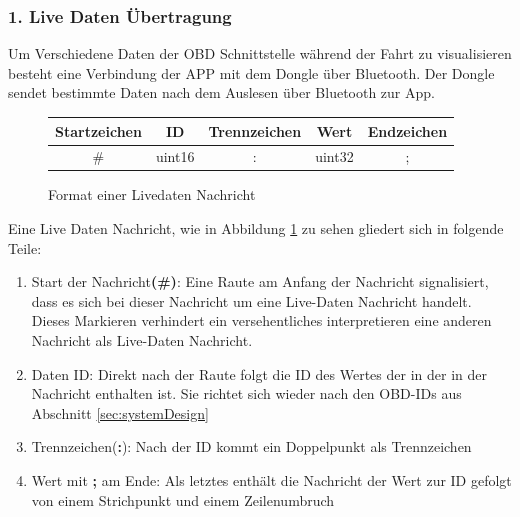 \subsubsection*{1. Live Daten Übertragung}
Um Verschiedene Daten der OBD Schnittstelle während der Fahrt zu visualisieren besteht eine Verbindung der APP mit dem Dongle über Bluetooth. Der Dongle sendet bestimmte Daten nach dem Auslesen über Bluetooth zur App.
\begin{figure}[h]
\begin{center}
  \begin{tabular}{ | c | c | c | c | c |}
    \hline
    Startzeichen & ID & Trennzeichen & Wert & Endzeichen \\ \hline
    \# & uint16 & : & uint32 & ; \\
    \hline
  \end{tabular}
  \caption{Format einer Livedaten Nachricht}
  \label{fig:LiveDataMessage}
\end{center}
\end{figure}
Eine Live Daten Nachricht, wie in Abbildung \ref{fig:LiveDataMessage} zu sehen gliedert sich in folgende Teile:
\begin{enumerate}
  \item Start der Nachricht\textbf{(\#)}: Eine Raute am Anfang der Nachricht signalisiert, dass es sich bei dieser Nachricht um eine Live-Daten Nachricht handelt. Dieses Markieren verhindert ein versehentliches interpretieren eine anderen Nachricht als Live-Daten Nachricht.
  \item Daten ID: Direkt nach der Raute folgt die ID des Wertes der in der in der Nachricht enthalten ist. Sie richtet sich wieder nach den OBD-IDs aus Abschnitt \ref{sec:systemDesign}
  \item Trennzeichen(\textbf{:}): Nach der ID kommt ein Doppelpunkt als Trennzeichen
  \item Wert mit \textbf{;} am Ende: Als letztes enthält die Nachricht der Wert zur ID gefolgt von einem Strichpunkt und einem Zeilenumbruch 
\end{enumerate}
\pagebreak
